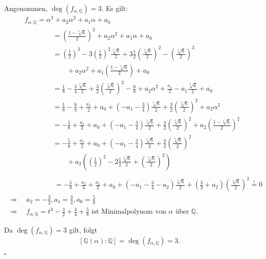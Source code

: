 \documentclass[12pt]{article}
\newcommand{\QED}{\begin{flushright} $\square$ \end{flushright}}
\newcommand{\df}{\enspace\Longrightarrow\enspace}
\newcommand{\grad}{\operatorname{deg}}
\begin{document}
\begin{enumerate}
	Angenommen, $\grad(f_{\alpha,\mathbb{Q}})=3$. Es gilt:
	\begin{align*}
		&f_{\alpha,\mathbb{Q}}=\alpha^3+a_2\alpha^2+a_1\alpha+a_0 \\
		&\quad\quad\quad\quad=\left(\frac{1-\sqrt[3]{6}}{2}\right)^3+a_2\alpha^2+a_1\alpha+a_0 \\
		&\quad\quad\quad\quad=\left(\frac{1}{2}\right)^3-3\left(\frac{1}{2}\right)^2\frac{\sqrt[3]{6}}{2}+3\frac{1}{2}\left(\frac{\sqrt[3]{6}}{2}\right)^2-\left(\frac{\sqrt[3]{6}}{2}\right)^3 \\
		&\quad\quad\quad\quad\quad\quad+a_2\alpha^2+a_1\left(\frac{1-\sqrt[3]{6}}{2}\right)+a_0 \\
		&\quad\quad\quad\quad=\frac{1}{8}-\frac{3}{4}\frac{\sqrt[3]{6}}{2}+\frac{3}{2}\left(\frac{\sqrt[3]{6}}{2}\right)^2-\frac{6}{8}+a_2\alpha^2+\frac{a_1}{2}-a_1\frac{\sqrt[3]{6}}{2}+a_0 \\
		&\quad\quad\quad\quad=\frac{1}{8}-\frac{6}{8}+\frac{a_1}{2}+a_0+\left(-a_1-\frac{3}{4}\right)\frac{\sqrt[3]{6}}{2}+\frac{3}{2}\left(\frac{\sqrt[3]{6}}{2}\right)^2+a_2\alpha^2 \\
		&\quad\quad\quad\quad=-\frac{5}{8}+\frac{a_1}{2}+a_0+\left(-a_1-\frac{3}{4}\right)\frac{\sqrt[3]{6}}{2}+\frac{3}{2}\left(\frac{\sqrt[3]{6}}{2}\right)^2+a_2\left(\frac{1-\sqrt[3]{6}}{2}\right)^2 \\
		&\quad\quad\quad\quad=-\frac{5}{8}+\frac{a_1}{2}+a_0+\left(-a_1-\frac{3}{4}\right)\frac{\sqrt[3]{6}}{2}+\frac{3}{2}\left(\frac{\sqrt[3]{6}}{2}\right)^2 \\
		&\quad\quad\quad\quad\quad\quad+a_2\left(\left(\frac{1}{2}\right)^2-2\frac{1}{2}\frac{\sqrt[3]{6}}{2}+\left(\frac{\sqrt[3]{6}}{2}\right)^2\right) \\
	\end{align*}
	\begin{align*}		
		&\quad\quad\quad\quad=-\frac{5}{8}+\frac{a_2}{4}+\frac{a_1}{2}+a_0+\left(-a_1-\frac{3}{4}-a_2\right)\frac{\sqrt[3]{6}}{2}+\left(\frac{3}{2}+a_2\right)\left(\frac{\sqrt[3]{6}}{2}\right)^2\overset{!}{=}0 \\
		\df&a_2=-\frac{3}{2},a_1=\frac{3}{4},a_0=\frac{5}{8} \\
		\df&f_{\alpha,\mathbb{Q}}=t^3-\frac{3}{2}+\frac{3}{4}+\frac{5}{8}\text{ ist Minimalpolynom von $\alpha$ über $\mathbb{Q}$}.
	\end{align*}
	
	Da $\grad(f_{\alpha,\mathbb{Q}})=3$ gilt, folgt $$\left[\mathbb{Q}(\alpha):\mathbb{Q}\right]=\grad(f_{\alpha,\mathbb{Q}})=3.$$
	\QED
	

\end{enumerate}
\end{document}
